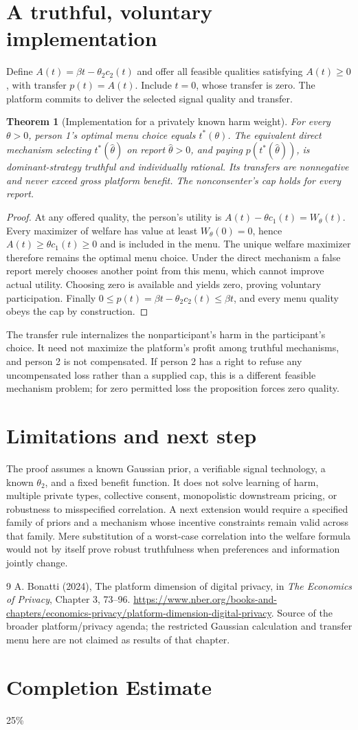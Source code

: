 \documentclass[11pt,a4paper]{article}
\newtheorem{theorem}{Theorem}[section]
\theoremstyle{definition}
\theoremstyle{remark}
\begin{document}
\section{A truthful, voluntary implementation}
Define $A(t)=\beta t-\theta_2c_2(t)$ and offer all feasible qualities satisfying $A(t)\ge0$, with transfer $p(t)=A(t)$. Include $t=0$, whose transfer is zero. The platform commits to deliver the selected signal quality and transfer.
\begin{theorem}[Implementation for a privately known harm weight]
For every $\theta>0$, person 1's optimal menu choice equals $t^*(\theta)$. The equivalent direct mechanism selecting $t^*(\widehat\theta)$ on report $\widehat\theta>0$, and paying $p(t^*(\widehat\theta))$, is dominant-strategy truthful and individually rational. Its transfers are nonnegative and never exceed gross platform benefit. The nonconsenter's cap holds for every report.
\end{theorem}
\begin{proof}
At any offered quality, the person's utility is
$A(t)-\theta c_1(t)=W_\theta(t)$. Every maximizer of welfare has value at least $W_\theta(0)=0$, hence $A(t)\ge\theta c_1(t)\ge0$ and is included in the menu. The unique welfare maximizer therefore remains the optimal menu choice. Under the direct mechanism a false report merely chooses another point from this menu, which cannot improve actual utility. Choosing zero is available and yields zero, proving voluntary participation. Finally
$0\le p(t)=\beta t-\theta_2c_2(t)\le\beta t$,
and every menu quality obeys the cap by construction.
\end{proof}
The transfer rule internalizes the nonparticipant's harm in the participant's choice. It need not maximize the platform's profit among truthful mechanisms, and person 2 is not compensated. If person 2 has a right to refuse any uncompensated loss rather than a supplied cap, this is a different feasible mechanism problem; for zero permitted loss the proposition forces zero quality.
\section{Limitations and next step}
The proof assumes a known Gaussian prior, a verifiable signal technology, a known $\theta_2$, and a fixed benefit function. It does not solve learning of harm, multiple private types, collective consent, monopolistic downstream pricing, or robustness to misspecified correlation. A next extension would require a specified family of priors and a mechanism whose incentive constraints remain valid across that family. Mere substitution of a worst-case correlation into the welfare formula would not by itself prove robust truthfulness when preferences and information jointly change.
\begin{thebibliography}{9}
 A. Bonatti (2024), The platform dimension of digital privacy, in \emph{The Economics of Privacy}, Chapter 3, 73--96. \url{https://www.nber.org/books-and-chapters/economics-privacy/platform-dimension-digital-privacy}. Source of the broader platform/privacy agenda; the restricted Gaussian calculation and transfer menu here are not claimed as results of that chapter.
\end{thebibliography}

\section{Completion Estimate}
25\%
\end{document}
